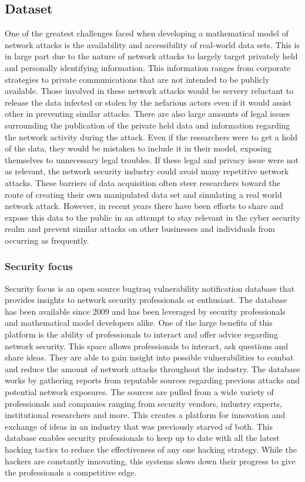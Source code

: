 \documentclass{article}
\begin{document}
\subsection{Dataset}

One of the greatest challenges faced when developing a mathematical model of network attacks is the availability and accessibility of real-world data sets. This is in large part due to the nature of network attacks to largely target privately held and personally identifying information. This information ranges from corporate strategies to private communications that are not intended to be publicly available. Those involved in these network attacks would be servery reluctant to release the data infected or stolen by the nefarious actors even if it would assist other in preventing similar attacks. There are also large amounts of legal issues surrounding the publication of the private held data and information regarding the network activity during the attack. Even if the researchers were to get a hold of the data, they would be mistaken to include it in their model, exposing themselves to unnecessary legal troubles. If these legal and privacy issue were not as relevant, the network security industry could avoid many repetitive network attacks. These barriers of data acquisition often steer researchers toward the route of creating their own manipulated data set and simulating a real world network attack. However, in recent years there have been efforts to share and expose this data to the public in an attempt to stay relevant in the cyber security realm and prevent similar attacks on other businesses and individuals from occurring as frequently. 

\subsubsection{Security focus}
Security focus is an open source bugtraq vulnerability notification database that provides insights to network security professionals or enthusiast\cite{securityfocus2009}. The database has been available since 2009 and has been leveraged by security professionals and mathematical model developers alike. One of the large benefits of this platform is the ability of professionals to interact and offer advice regarding network security. This space allows professionals to interact, ask questions and share ideas. They are able to gain insight into possible vulnerabilities to combat and reduce the amount of network attacks throughout the industry. The database works by gathering reports from reputable sources regarding previous attacks and potential network exposures. The sources are pulled from a wide variety of professionals and companies ranging from security vendors, industry experts, institutional researchers and more. This creates a platform for innovation and exchange of ideas in an industry that was previously starved of both. This database enables security professionals to keep up to date with all the latest hacking tactics to reduce the effectiveness of any one hacking strategy. While the hackers are constantly innovating, this systems slows down their progress to give the professionals a competitive edge. 
\end{document}
